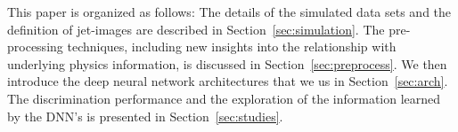 \documentclass{article}
\begin{document}


This paper is organized as follows:  The details of the simulated data sets and the definition of jet-images are described in Section~\ref{sec:simulation}.    The pre-processing techniques, including new insights into the relationship with underlying physics information, is discussed in Section~\ref{sec:preprocess}.  We then introduce the deep neural network architectures that we us in Section~\ref{sec:arch}.  The discrimination performance and the exploration of the information learned by the DNN's is presented in Section~\ref{sec:studies}.

\end{document}

